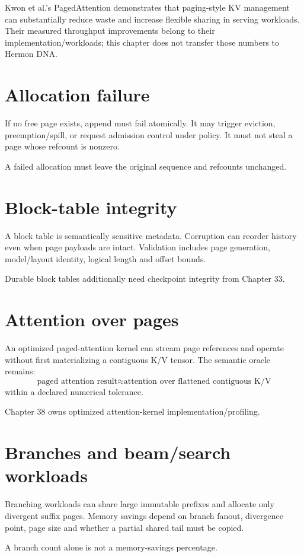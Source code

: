 Kwon et al.'s PagedAttention demonstrates that paging-style KV management can substantially reduce waste and increase flexible sharing in serving workloads. Their measured throughput improvements belong to their implementation/workloads; this chapter does not transfer those numbers to Hermon DNA.

\section{Allocation failure}
If no free page exists, append must fail atomically. It may trigger eviction, preemption/spill, or request admission control under policy. It must not steal a page whose refcount is nonzero.

A failed allocation must leave the original sequence and refcounts unchanged.

\section{Block-table integrity}
A block table is semantically sensitive metadata. Corruption can reorder history even when page payloads are intact. Validation includes page generation, model/layout identity, logical length and offset bounds.

Durable block tables additionally need checkpoint integrity from Chapter 33.

\section{Attention over pages}
An optimized paged-attention kernel can stream page references and operate without first materializing a contiguous K/V tensor. The semantic oracle remains:
\[
\text{paged attention result}
\approx
\text{attention over flattened contiguous K/V}
\]
within a declared numerical tolerance.

Chapter 38 owns optimized attention-kernel implementation/profiling.

\section{Branches and beam/search workloads}
Branching workloads can share large immutable prefixes and allocate only divergent suffix pages. Memory savings depend on branch fanout, divergence point, page size and whether a partial shared tail must be copied.

A branch count alone is not a memory-savings percentage.

